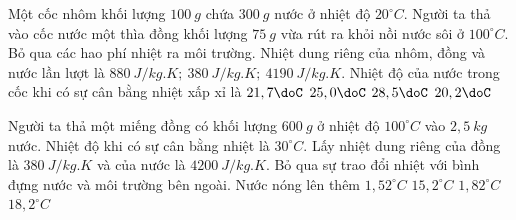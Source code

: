 \begin{ex}
	Một cốc nhôm khối lượng $100 \ g$ chứa $300 \ g$ nước ở nhiệt độ $20^\circ C$. Người ta thả vào cốc nước một thìa đồng khối lượng $75 \ g$ vừa rút ra khỏi nồi nước sôi ở $100^\circ C$.  Bỏ qua các hao phí nhiệt ra môi trường. Nhiệt dung riêng của nhôm, đồng và nước lần lượt là  $880 \ J / kg. K;\ 380 \ J / kg. K;\ 4190 \ J / kg. K$. Nhiệt độ của nước trong cốc khi có sự cân bằng nhiệt xấp xỉ là
	\choice
	{\True $21,7\doC$}
	{$25,0 \doC$}
	{$28,5 \doC$}
	{$20,2 \doC$}
	\end{ex}
\begin{ex}
	Người ta thả một miếng đồng có khối lượng $600\ g$ ở nhiệt độ $100^\circ C$ vào $2,5\ kg$ nước. Nhiệt độ khi có sự cân bằng nhiệt là $30^\circ C$. Lấy nhiệt dung riêng của đồng là $380\ J/kg.K$ và của nước là $4200\ J/kg.K$. Bỏ qua sự trao đổi nhiệt với bình đựng nước và môi trường bên ngoài. Nước nóng lên thêm 
	\choice
	{\True $1,52^\circ C$}
	{$15,2^\circ C$}
	{$1,82^\circ C$}
	{$18,2^\circ C$}
	\end{ex}



